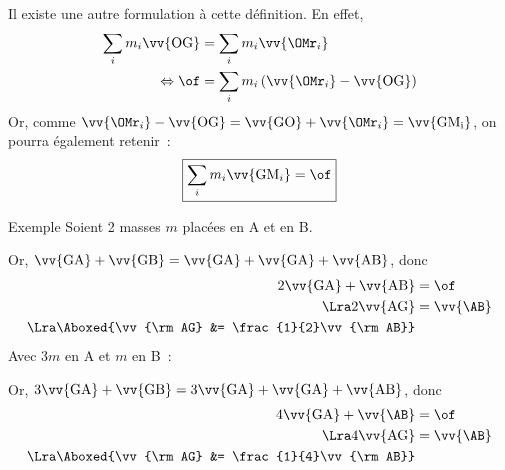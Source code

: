 \documentclass[../main/main.tex]{subfiles}
\begin{document}
Il existe une autre formulation à cette définition. En effet,
\begin{align*}
    \sum_i m_i\vv{\rm OG} &= \sum_i m_i\vv{\OMr_i}
    \\
    \Leftrightarrow
    \of &= \sum_i m_i \left( \vv{\OMr_i} - \vv{\rm OG} \right)
\end{align*}
Or, comme $\vv{\OMr_i} - \vv{\rm OG} = \vv{\rm GO} + \vv{\OMr_i} = \vv{\rm
GM_i}$, on pourra également retenir~:
\[\boxed{\sum_i m_i\vv{{\rm GM}_i} = \of}\]

\begin{rexem}{Exemple}
    Soient 2 masses $m$ placées en A et en B.
    \begin{center}
    \end{center}

    Or, $\vv{\rm GA} + \vv{\rm GB} = \vv{\rm GA} + \vv{\rm GA} + \vv{\rm AB}$,
    donc
    \begin{align*}
        2\vv{\rm GA} + \vv{\rm AB} &= \of
        \\
        \Lra
        2\vv{\rm AG} &= \vv{\AB}
        \\
        \Lra
        \Aboxed{\vv{\rm AG} &= \frac{1}{2}\vv{\rm AB}}
    \end{align*}
    Avec $3m$ en A et $m$ en B~:
    \begin{center}
    \end{center}

    Or, $3\vv{\rm GA} + \vv{\rm GB} = 3\vv{\rm GA} + \vv{\rm GA} + \vv{\rm AB}$,
    donc
    \begin{align*}
        4\vv{\rm GA} + \vv{\AB} &= \of
        \\
        \Lra
        4\vv{\rm AG} &= \vv{\AB}
        \\
        \Lra
        \Aboxed{\vv{\rm AG} &= \frac{1}{4}\vv{\rm AB}}
    \end{align*}
\end{rexem}
\end{document}
